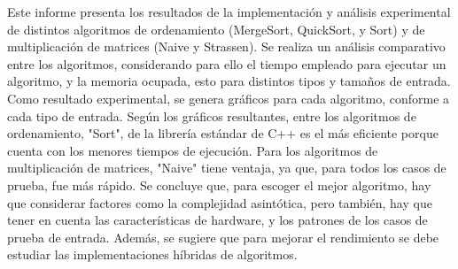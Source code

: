 Este informe presenta los resultados de la implementación y análisis experimental de distintos algoritmos de ordenamiento (MergeSort, QuickSort, y Sort) y de multiplicación de matrices (Naive y Strassen). Se realiza un análisis comparativo entre los algoritmos, considerando para ello el tiempo empleado para ejecutar un algoritmo, y la memoria ocupada, esto para distintos tipos y tamaños de entrada. Como resultado experimental, se genera gráficos para cada algoritmo, conforme a cada tipo de entrada. Según los gráficos resultantes, entre los algoritmos de ordenamiento, "Sort", de la librería estándar de C++ es el más eficiente porque cuenta con los menores tiempos de ejecución. Para los algoritmos de multiplicación de matrices, "Naive" tiene ventaja, ya que, para todos los casos de prueba, fue más rápido. Se concluye que, para escoger el mejor algoritmo, hay que considerar factores como la complejidad asintótica, pero también, hay que tener en cuenta las características de hardware, y los patrones de los casos de prueba de entrada. Además, se sugiere que para mejorar el rendimiento se debe estudiar las implementaciones híbridas de algoritmos.

